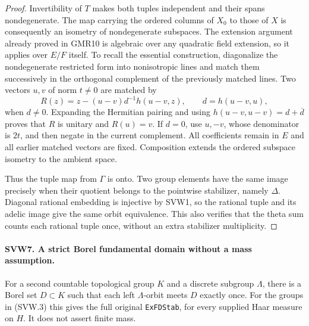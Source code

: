 \begin{proof}
Invertibility of $T$ makes both tuples independent and their spans
nondegenerate.  The map carrying the ordered columns of $X_0$ to
those of $X$ is consequently an isometry of nondegenerate
subspaces.  The extension argument already proved in GMR10 is
algebraic over any quadratic field extension, so it applies over
$E/F$ itself.  To recall the essential construction, diagonalize
the nondegenerate restricted form into nonisotropic lines and match
them successively in the orthogonal complement of the previously
matched lines.  Two vectors $u,v$ of norm $t\ne0$ are matched by
\[
 R(z)=z-(u-v)d^{-1}h(u-v,z),\qquad d=h(u-v,u),
 \tag{SVW.13}
\]
when $d\ne0$.  Expanding the Hermitian pairing and using
$h(u-v,u-v)=d+\overline d$ proves that $R$ is unitary and
$R(u)=v$.  If $d=0$, use $u,-v$, whose denominator is $2t$, and
then negate in the current complement.  All coefficients remain
in $E$ and all earlier matched vectors are fixed.  Composition
extends the ordered subspace isometry to the ambient space.

Thus the tuple map from $\Gamma$ is onto.  Two group elements have
the same image precisely when their quotient belongs to the
pointwise stabilizer, namely $\Delta$.  Diagonal rational embedding
is injective by SVW1, so the rational tuple and its adelic image
give the same orbit equivalence.  This also verifies that the
theta sum counts each rational tuple once, without an extra
stabilizer multiplicity.
\end{proof}

\paragraph{SVW7. A strict Borel fundamental domain without a mass assumption.}
\label{claim:SVW7}
For a second countable topological group $K$ and a discrete subgroup
$\Lambda$, there is a Borel set $D\subset K$ such that each left
$\Lambda$-orbit meets $D$ exactly once.  For the groups in (SVW.3)
this gives the full original \texttt{ExFDStab}, for every supplied
Haar measure on $H$.  It does not assert finite mass.


